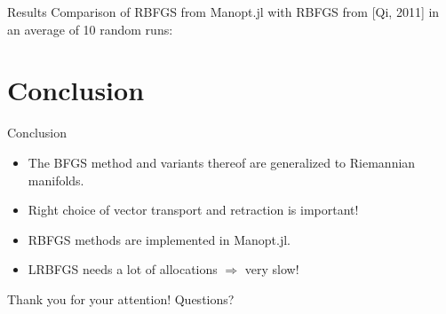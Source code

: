 \documentclass[9.4pt]{beamer}
\begin{document}
\begin{frame}{Results}
    Comparison of RBFGS from Manopt.jl with RBFGS from [Qi, 2011] in an average of 10 random runs:
    \begin{table}[H]
    \end{table}
\end{frame}

\section{Conclusion}

\begin{frame}{Conclusion}
    \begin{itemize}
        \item The BFGS method and variants thereof are generalized to Riemannian manifolds.
        \item Right choice of vector transport and retraction is important!
        \item RBFGS methods are implemented in Manopt.jl.
        \item LRBFGS needs a lot of allocations $\Rightarrow$ very slow!
    \end{itemize}
    \begin{center}
        Thank you for your attention! Questions? 
    \end{center}
\end{frame}
\end{document}
